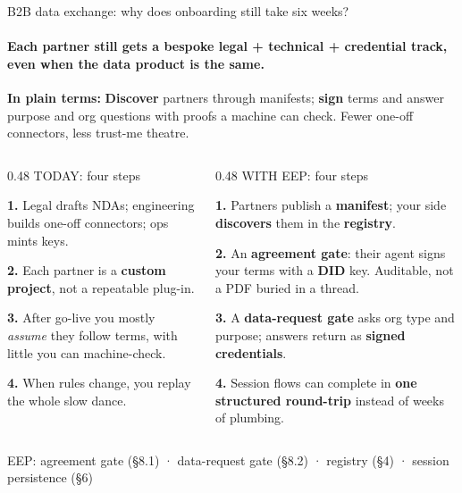 \documentclass[aspectratio=169,10pt]{beamer}
\begin{document}
\begin{frame}{B2B data exchange: why does onboarding still take six weeks?}
\framesubtitle{Each partner still gets a bespoke legal + technical + credential track, even when the \textbf{data product} is the same.}

\vspace{0.08cm}
{\small\color{amber}\textbf{In plain terms:}\; \textbf{Discover} partners through manifests; \textbf{sign} terms and answer purpose and org questions with proofs a machine can check. Fewer one-off connectors, less trust-me theatre.}

\vspace{0.08cm}
\begin{columns}[T]
\begin{column}{0.48\textwidth}
{\small\color{rose} TODAY: four steps}\par
\vspace{2pt}
{\small\color{txtm}%
\textbf{1.}\; Legal drafts NDAs; engineering builds one-off connectors; ops mints keys.\par
\textbf{2.}\; Each partner is a \textbf{custom project}, not a repeatable plug-in.\par
\textbf{3.}\; After go-live you mostly \emph{assume} they follow terms, with little you can machine-check.\par
\textbf{4.}\; When rules change, you replay the whole slow dance.\par
}
\end{column}

\begin{column}{0.48\textwidth}
{\small\color{mint} WITH EEP: four steps}\par
\vspace{2pt}
{\small\color{txtm}%
\textbf{1.}\; Partners publish a \textbf{manifest}; your side \textbf{discovers} them in the \textbf{registry}.\par
\textbf{2.}\; An \textbf{agreement gate}: their agent signs your terms with a \textbf{DID} key. Auditable, not a PDF buried in a thread.\par
\textbf{3.}\; A \textbf{data-request gate} asks org type and purpose; answers return as \textbf{signed credentials}.\par
\textbf{4.}\; Session flows can complete in \textbf{one structured round-trip} instead of weeks of plumbing.\par
}
\end{column}
\end{columns}

\vspace{4pt}
{\footnotesize\color{slate} EEP: agreement gate (§8.1) · data-request gate (§8.2) · registry (§4) · session persistence (§6)}
\end{frame}
\end{document}
